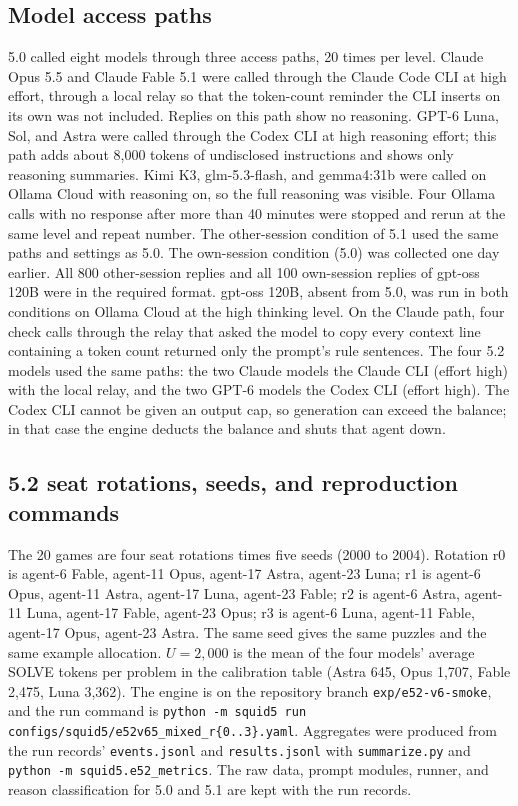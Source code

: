 \subsection{Model access paths}\label{app:models}
5.0 called eight models through three access paths, 20 times per level. Claude Opus 5.5 and Claude Fable 5.1 were called through the Claude Code CLI at high effort, through a local relay so that the token-count reminder the CLI inserts on its own was not included. Replies on this path show no reasoning. GPT-6 Luna, Sol, and Astra were called through the Codex CLI at high reasoning effort; this path adds about 8,000 tokens of undisclosed instructions and shows only reasoning summaries. Kimi K3, glm-5.3-flash, and gemma4:31b were called on Ollama Cloud with reasoning on, so the full reasoning was visible. Four Ollama calls with no response after more than 40 minutes were stopped and rerun at the same level and repeat number. The other-session condition of 5.1 used the same paths and settings as 5.0. The own-session condition (5.0) was collected one day earlier. All 800 other-session replies and all 100 own-session replies of gpt-oss 120B were in the required format. gpt-oss 120B, absent from 5.0, was run in both conditions on Ollama Cloud at the high thinking level. On the Claude path, four check calls through the relay that asked the model to copy every context line containing a token count returned only the prompt's rule sentences. The four 5.2 models used the same paths: the two Claude models the Claude CLI (effort high) with the local relay, and the two GPT-6 models the Codex CLI (effort high). The Codex CLI cannot be given an output cap, so generation can exceed the balance; in that case the engine deducts the balance and shuts that agent down.

\subsection{5.2 seat rotations, seeds, and reproduction commands}\label{app:arena-repro}
The 20 games are four seat rotations times five seeds (2000 to 2004). Rotation r0 is agent-6 Fable, agent-11 Opus, agent-17 Astra, agent-23 Luna; r1 is agent-6 Opus, agent-11 Astra, agent-17 Luna, agent-23 Fable; r2 is agent-6 Astra, agent-11 Luna, agent-17 Fable, agent-23 Opus; r3 is agent-6 Luna, agent-11 Fable, agent-17 Opus, agent-23 Astra. The same seed gives the same puzzles and the same example allocation. $U=2{,}000$ is the mean of the four models' average SOLVE tokens per problem in the calibration table (Astra 645, Opus 1,707, Fable 2,475, Luna 3,362). The engine is on the repository branch \texttt{exp/e52-v6-smoke}, and the run command is \texttt{python -m squid5 run configs/squid5/e52v65\_mixed\_r\{0..3\}.yaml}. Aggregates were produced from the run records' \texttt{events.jsonl} and \texttt{results.jsonl} with \texttt{summarize.py} and \texttt{python -m squid5.e52\_metrics}. The raw data, prompt modules, runner, and reason classification for 5.0 and 5.1 are kept with the run records.

